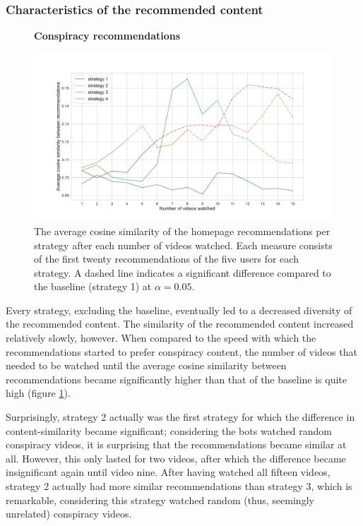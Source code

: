 \documentclass[../main.tex]{subfiles}
\begin{document}
\subsubsection{Characteristics of the recommended content}
\begin{figure}
  \textbf{Conspiracy recommendations}\par\medskip
  \centering
  \includegraphics[keepaspectratio, width=\textwidth]{images/similarity.pdf}
  \caption{The average cosine similarity of the homepage recommendations per strategy after each number of videos watched. Each measure consists of the first twenty recommendations of the five users for each strategy. A dashed line indicates a significant difference compared to the baseline (strategy 1) at $\alpha = 0.05$.}
  \label{fig:similarities}
\end{figure}

Every strategy, excluding the baseline, eventually led to a decreased diversity of the recommended content. The 
similarity of the recommended content increased relatively slowly, however. When compared to the speed with 
which the recommendations started to prefer conspiracy content, the number of videos that needed to be watched 
until the average cosine similarity between recommendations became significantly higher than that of the 
baseline is quite high (figure \ref{fig:similarities}). 

Surprisingly, strategy 2 actually was the first strategy for which the difference in content-similarity 
became significant; considering the bots watched random conspiracy videos, it is surprising that the 
recommendations became similar at all. However, this only lasted for two videos, after which the difference 
became insignificant again until video nine. After having watched all fifteen videos, strategy 2 actually had 
more similar recommendations than strategy 3, which is remarkable, considering this strategy watched random 
(thus, seemingly unrelated) conspiracy videos. 
\end{document}
